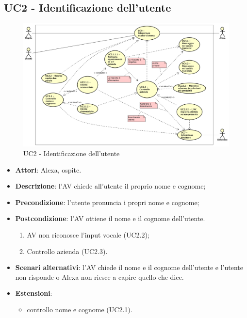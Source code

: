 \documentclass[../AnalisiDeiRequisiti.tex]{subfiles}
\begin{document}
\subsection{UC2 - Identificazione dell'utente}
\begin{figure}[!h]
	\centering
	\includegraphics[width=\textwidth]{UseCases/UC2-Identificazione/UC2.png}
	\caption{UC2 - Identificazione dell'utente}
\end{figure}
\label{sssec:UC2} 
\begin{itemize} 
\item \textbf{Attori}: Alexa, ospite.
\item \textbf{Descrizione}: l'AV chiede all'utente il proprio nome e cognome;
\item \textbf{Precondizione}: l'utente pronuncia i propri nome e cognome;
\item \textbf{Postcondizione}: l'AV ottiene il nome e il cognome dell'utente.
\begin{enumerate}
	\item AV non riconosce l'input vocale (UC2.2);\item Controllo azienda (UC2.3). 
 \end{enumerate}
\item \textbf{Scenari alternativi}: l'AV chiede il nome e il cognome dell'utente e l'utente non risponde o Alexa non riesce a capire quello che dice.
\item \textbf{Estensioni}:\begin{itemize}\item controllo nome e cognome (UC2.1).\end{itemize}
\end{itemize} 
\end{document}
